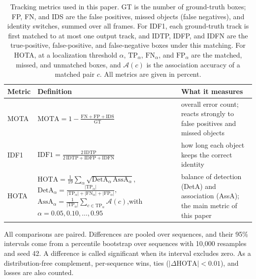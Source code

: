 \documentclass[pdflatex,sn-mathphys-num,iicol]{sn-jnl}
\begin{document}
\begin{table}[t]
\caption{Tracking metrics used in this paper. GT is the number of
ground-truth boxes; FP, FN, and IDS are the false positives, missed objects
(false negatives), and identity switches, summed over all frames. For IDF1,
each ground-truth track is first matched to at most one output track, and
IDTP, IDFP, and IDFN are the true-positive, false-positive, and
false-negative boxes under this matching. For HOTA, at a localization
threshold $\alpha$, $\mathrm{TP}_\alpha$, $\mathrm{FN}_\alpha$, and
$\mathrm{FP}_\alpha$ are the matched, missed, and unmatched boxes, and
$\mathcal{A}(c)$ is the association accuracy of a matched pair $c$. All
metrics are given in percent.}
\label{tab:metrics}
\centering\footnotesize
\setlength{\tabcolsep}{4pt}
\renewcommand{\arraystretch}{1.6}
\begin{tabular}{@{}l>{\raggedright\arraybackslash}p{78mm}>{\raggedright\arraybackslash}p{58mm}@{}}
\toprule
Metric & Definition & What it measures\\
\midrule
MOTA \cite{bernardin2008clear} & $\displaystyle \mathrm{MOTA}=1-\frac{\mathrm{FN}+\mathrm{FP}+\mathrm{IDS}}{\mathrm{GT}}$ & overall error count; reacts strongly to false positives and missed objects\\
IDF1 \cite{ristani2016idf1} & $\displaystyle \mathrm{IDF1}=\frac{2\,\mathrm{IDTP}}{2\,\mathrm{IDTP}+\mathrm{IDFP}+\mathrm{IDFN}}$ & how long each object keeps the correct identity\\
HOTA \cite{luiten2021hota} & $\displaystyle \mathrm{HOTA}=\frac{1}{19}\sum_{\alpha}\sqrt{\mathrm{DetA}_\alpha\,\mathrm{AssA}_\alpha}$,\newline $\displaystyle \mathrm{DetA}_\alpha=\frac{|\mathrm{TP}_\alpha|}{|\mathrm{TP}_\alpha|+|\mathrm{FN}_\alpha|+|\mathrm{FP}_\alpha|}$,\quad $\displaystyle \mathrm{AssA}_\alpha=\frac{1}{|\mathrm{TP}_\alpha|}\sum_{c\in\mathrm{TP}_\alpha}\mathcal{A}(c)$,\newline with $\alpha=0.05,0.10,\dots,0.95$ & balance of detection (DetA) and association (AssA); the main metric of this paper\\
\bottomrule
\end{tabular}
\end{table}

All comparisons are paired. Differences are pooled over sequences, and their
95\% intervals come from a percentile bootstrap over sequences
\cite{efron1993bootstrap} with 10,000 resamples and seed 42. A difference is
called significant when its interval excludes zero. As a distribution-free
complement, per-sequence wins, ties ($|\Delta\mathrm{HOTA}|<0.01$), and losses
are also counted.
\end{document}
